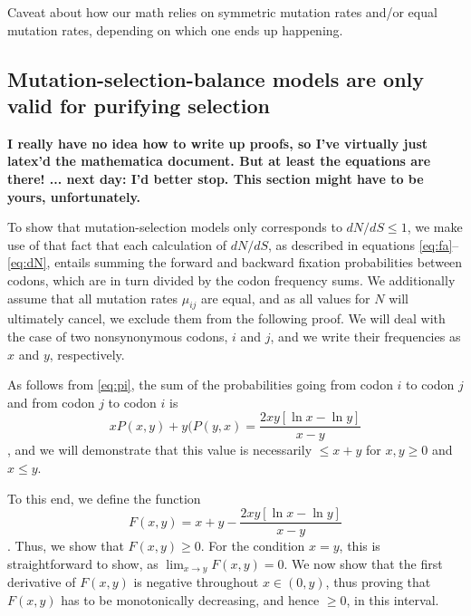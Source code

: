 \documentclass[11pt]{article}
\begin{document}
Caveat about how our math relies on symmetric mutation rates and/or equal mutation rates, depending on which one ends up happening.
	

\subsection*{Mutation-selection-balance models are only valid for purifying selection}

\textbf{I really have no idea how to write up proofs, so I've virtually just latex'd the mathematica document. But at least the equations are there! ... next day: I'd better stop. This section might have to be yours, unfortunately.}

To show that mutation-selection models only corresponds to $dN/dS \leq 1$, we make use of that fact that each calculation of $dN/dS$, as described in equations \eqref{eq:fa}--\eqref{eq:dN}, entails summing the forward and backward fixation probabilities between codons, which are in turn divided by the codon frequency sums. We additionally assume that all mutation rates $\mu_{ij}$ are equal, and as all values for $N$ will ultimately cancel, we exclude them from the following proof. We will deal with the case of two nonsynonymous codons, $i$ and $j$, and we write their frequencies as $x$ and $y$, respectively.

As follows from \eqref{eq:pi}, the sum of the probabilities going from codon $i$ to codon $j$ and from codon $j$ to codon $i$ is \begin{equation} xP(x,y) + y(P(y,x) = \frac{2xy [\ln x - \ln y]}{x - y}\end{equation}, and we will demonstrate that this value is necessarily $\leq x + y$ for $x,y \geq 0$ and $x \leq y$.

To this end, we define the function \begin{equation} F(x,y) = x + y - \frac{2xy [\ln x - \ln y]}{x - y} \end{equation}. Thus, we show that $F(x,y) \geq 0$. For the condition $x=y$, this is straightforward to show, as $\lim_{x \to y}F(x,y) = 0$.
We now show that the first derivative of $F(x, y)$ is negative throughout $x \in (0,y)$, thus proving that $F(x, y)$ has to be monotonically decreasing, and hence $\geq0$, in this interval.
\end{document}

